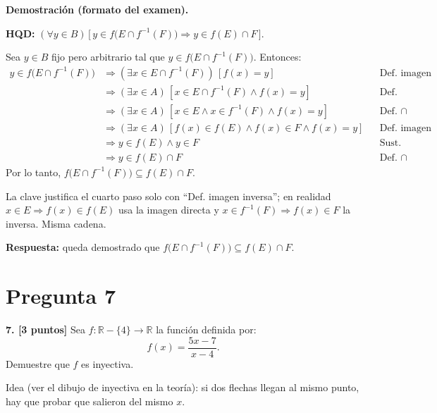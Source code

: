 \documentclass[11pt]{article}
\newcommand{\hl}[1]{\colorbox{green!35}{#1}}
\begin{document}
\textbf{Demostración (formato del examen).}

\textbf{HQD:} $(\forall y\in B)\,\big[\,y\in f\big(E\cap f^{-1}(F)\big)\Rightarrow y\in f(E)\cap F\,\big]$.

Sea $y\in B$ fijo pero arbitrario tal que $y\in f\big(E\cap f^{-1}(F)\big)$. Entonces:
\begin{align*}
y\in f\big(E\cap f^{-1}(F)\big) &\Rightarrow (\exists x\in E\cap f^{-1}(F))\,[f(x)=y] && \text{Def. imagen directa}\\
&\Rightarrow (\exists x\in A)\,[x\in E\cap f^{-1}(F)\wedge f(x)=y] && \text{Def. subconjunto}\\
&\Rightarrow (\exists x\in A)\,[x\in E\wedge x\in f^{-1}(F)\wedge f(x)=y] && \text{Def. }\cap\\
&\Rightarrow (\exists x\in A)\,[f(x)\in f(E)\wedge f(x)\in F\wedge f(x)=y] && \text{Def. imagen directa e inversa}\\
&\Rightarrow y\in f(E)\wedge y\in F && \text{Sust.}\\
&\Rightarrow y\in f(E)\cap F && \text{Def. }\cap
\end{align*}
Por lo tanto, $f\big(E\cap f^{-1}(F)\big)\subseteq f(E)\cap F$.

\begin{nota}
La clave justifica el cuarto paso solo con ``Def. imagen inversa''; en realidad $x\in E\Rightarrow f(x)\in f(E)$ usa la imagen directa y $x\in f^{-1}(F)\Rightarrow f(x)\in F$ la inversa. Misma cadena.
\end{nota}

\textbf{Respuesta:} queda demostrado que $f\big(E\cap f^{-1}(F)\big)\subseteq f(E)\cap F$.

\clearpage
\section*{Pregunta 7}

\textbf{7. [3 puntos]} Sea $f:\mathbb R-\{4\}\to\mathbb R$ la función definida por:
\[
f(x)=\frac{5x-7}{x-4}.
\]
Demuestre que $f$ es \hl{inyectiva}.

{\small Idea (ver el dibujo de inyectiva en la teoría): si dos flechas llegan al mismo punto, hay que probar que salieron del mismo $x$.}

\end{document}
